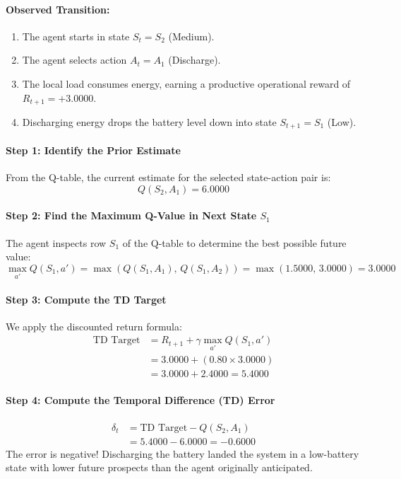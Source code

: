 \begin{example}
\paragraph{Observed Transition:}
\begin{enumerate}
    \item The agent starts in state $S_t = S_2$ (Medium).
    \item The agent selects action $A_t = A_1$ (Discharge).
    \item The local load consumes energy, earning a productive operational reward of $R_{t+1} = +3.0000$.
    \item Discharging energy drops the battery level down into state $S_{t+1} = S_1$ (Low).
\end{enumerate}

\paragraph{Step 1: Identify the Prior Estimate}
From the Q-table, the current estimate for the selected state-action pair is:
\begin{equation*}
Q(S_2, A_1) = 6.0000
\end{equation*}

\paragraph{Step 2: Find the Maximum Q-Value in Next State $S_1$}
The agent inspects row $S_1$ of the Q-table to determine the best possible future value:
\begin{equation*}
\max_{a'} Q(S_1, a') = \max\left( Q(S_1, A_1),\, Q(S_1, A_2) \right) = \max(1.5000,\, 3.0000) = 3.0000
\end{equation*}

\paragraph{Step 3: Compute the TD Target}
We apply the discounted return formula:
\begin{align*}
\text{TD Target} &= R_{t+1} + \gamma \max_{a'} Q(S_1, a')\\
&= 3.0000 + (0.80 \times 3.0000)\\
&= 3.0000 + 2.4000 = 5.4000
\end{align*}

\paragraph{Step 4: Compute the Temporal Difference (TD) Error}
\begin{align*}
\delta_t &= \text{TD Target} - Q(S_2, A_1)\\
&= 5.4000 - 6.0000 = -0.6000
\end{align*}
The error is negative! Discharging the battery landed the system in a low-battery state with lower future prospects than the agent originally anticipated.


\end{example}
